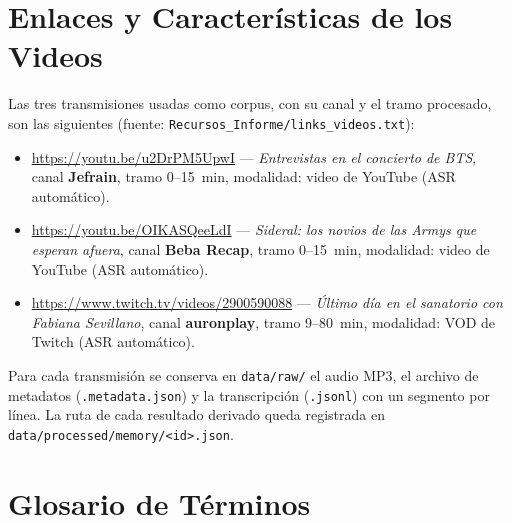 \documentclass[12pt,a4paper]{article}
\begin{document}
\appendix
\renewcommand{\thesection}{Anexo \Alph{section}}

\section{Enlaces y Características de los Videos}
\label{anexo:videos}

Las tres transmisiones usadas como corpus, con su canal y el tramo procesado, son las siguientes (fuente: \texttt{Recursos\_Informe/links\_videos.txt}):

\begin{itemize}
  \item \url{https://youtu.be/u2DrPM5UpwI} --- \emph{Entrevistas en el concierto de BTS}, canal \textbf{Jefrain}, tramo 0--15~min, modalidad: video de YouTube (ASR automático).
  \item \url{https://youtu.be/OIKASQeeLdI} --- \emph{Sideral: los novios de las Armys que esperan afuera}, canal \textbf{Beba Recap}, tramo 0--15~min, modalidad: video de YouTube (ASR automático).
  \item \url{https://www.twitch.tv/videos/2900590088} --- \emph{Último día en el sanatorio con Fabiana Sevillano}, canal \textbf{auronplay}, tramo 9--80~min, modalidad: VOD de Twitch (ASR automático).
\end{itemize}

Para cada transmisión se conserva en \texttt{data/raw/} el audio MP3, el archivo de metadatos (\texttt{.metadata.json}) y la transcripción (\texttt{.jsonl}) con un segmento por línea. La ruta de cada resultado derivado queda registrada en \texttt{data/processed/memory/<id>.json}.


\section{Glosario de Términos}
\label{anexo:glosario}
\end{document}
